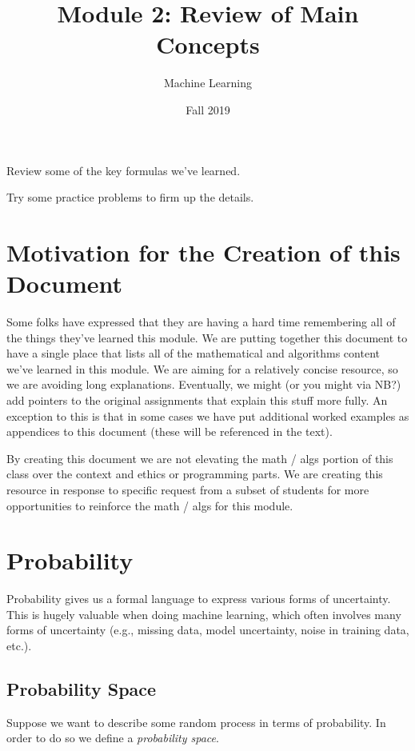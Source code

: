 \documentclass{tufte-handout}
\title{Module 2: Review of Main Concepts}
\author{Machine Learning}
\date{Fall 2019}
\begin{document}
\maketitle
\thispagestyle{firstpage}

\begin{learningobjectives}
\bi
\item Review some of the key formulas we've learned.
\item Try some practice problems to firm up the details.
\ei
\end{learningobjectives}

\section{Motivation for the Creation of this Document}

Some folks have expressed that they are having a hard time remembering all of the things they've learned this module.  We are putting together this document to have a single place that lists all of the mathematical and algorithms content we've learned in this module.  We are aiming for a relatively concise resource, so we are avoiding long explanations.  Eventually, we might (or you might via NB?) add pointers to the original assignments that explain this stuff more fully.  An exception to this is that in some cases we have put additional worked examples as appendices to this document (these will be referenced in the text).

\vspace{1em}
\begin{notice}
By creating this document we are not elevating the math / algs portion of this class over the context and ethics or programming parts.  We are creating this resource in response to specific request from a subset of students for more opportunities to reinforce the math / algs for this module.
\end{notice}

\section{Probability}

Probability gives us a formal language to express various forms of uncertainty.  This is hugely valuable when doing machine learning, which often involves many forms of uncertainty (e.g., missing data, model uncertainty, noise in training data, etc.).

\subsection{Probability Space}
Suppose we want to describe some random process in terms of probability.  In order to do so we define a \emph{probability space}.
\end{document}
